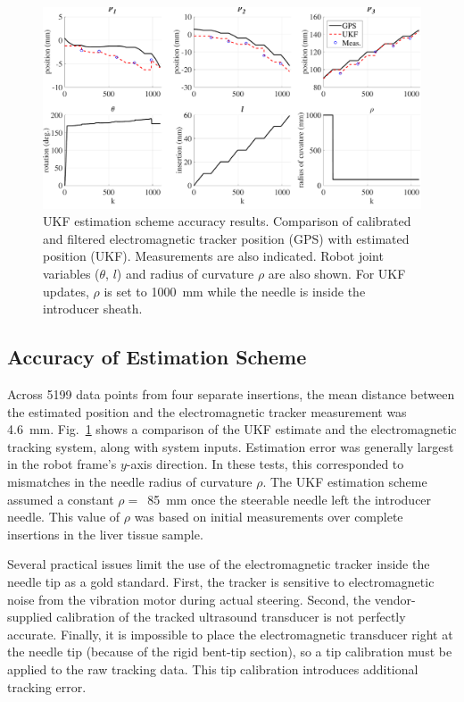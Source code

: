\begin{figure}[!t]
\centering
\includegraphics[width = \columnwidth]{./Images/Chapter5/UKFAccuracy/UKFAccuracy.pdf}%
\caption[UKF accuracy results]{UKF estimation scheme accuracy results. Comparison of calibrated and filtered electromagnetic tracker position (GPS) with estimated position (UKF). Measurements are also indicated. Robot joint variables ($\theta$, $l$) and radius of curvature $\rho$ are also shown. For UKF updates, $\rho$ is set to 1000~mm while the needle is inside the introducer sheath. }
\label{fig:UKFAccuracy}
\end{figure}  

\subsection{Accuracy of Estimation Scheme}
Across 5199 data points from four separate insertions, the mean distance between the estimated position and the electromagnetic tracker measurement was 4.6~mm. Fig.~\ref{fig:UKFAccuracy} shows a comparison of the UKF estimate and the electromagnetic tracking system, along with system inputs. Estimation error was generally largest in the robot frame's $y$-axis direction. In these tests, this corresponded to mismatches in the needle radius of curvature $\rho$. The UKF estimation scheme assumed a constant $\rho =$~85~mm once the steerable needle left the introducer needle. This value of $\rho$ was based on initial measurements over complete insertions in the liver tissue sample. 

Several practical issues limit the use of the electromagnetic tracker inside the needle tip as a gold standard. First, the tracker is sensitive to electromagnetic noise from the vibration motor during actual steering. Second, the vendor-supplied calibration of the tracked ultrasound transducer is not perfectly accurate. Finally, it is impossible to place the electromagnetic transducer right at the needle tip (because of the rigid bent-tip section), so a tip calibration must be applied to the raw tracking data. This tip calibration introduces additional tracking error.

